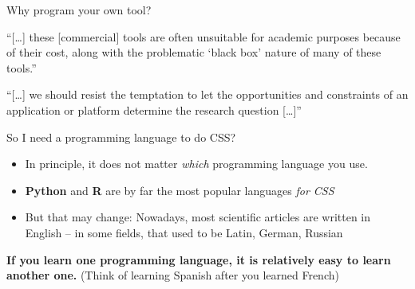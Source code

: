 \begin{frame}{Why program your own tool?}
	\begin{block}{\textcite{Vis2013}}
		``{[}\ldots{]} these {[}commercial{]} tools are often unsuitable for academic purposes because of their cost, along with the problematic `black box' nature of many of these tools.''
	\end{block}
	
	\begin{block}{\textcite{Mahrt2013}}
		``{[}\ldots{]} we should resist the temptation to let the opportunities and constraints of an application or platform determine the research question {[}\ldots{]}''
	\end{block}
\end{frame}



\begin{frame}{So I need a programming language to do CSS?}

\begin{itemize}
	\item In principle, it does not matter \emph{which} programming language you use.
	\item \textbf{Python} and \textbf{R} are by far the most popular languages \emph{for CSS}
	\item But that may change: Nowadays, most scientific articles are written in English -- in some fields, that used to be Latin, German, Russian
\end{itemize}

\textbf{If you learn one programming language, it is relatively easy to learn another one.}
(Think of learning Spanish after you learned French)

\end{frame}
